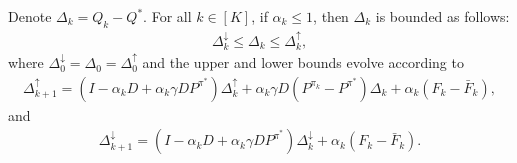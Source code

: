 \documentclass[10pt,a4paper]{amsart}
\begin{document}
\begin{lemma}
\label{lem_1}
Denote $\Delta_k = Q_k - Q^*$. For all $k \in [K]$, if $\alpha_k \leq 1$, then $\Delta_k$ is bounded as follows:
\begin{align*}
\Delta^{\downarrow}_k \leq \Delta_k \leq \Delta^{\uparrow}_k,
\end{align*}
where $\Delta^{\downarrow}_0 = \Delta_0 = \Delta^{\uparrow}_0$ and the upper and lower bounds evolve according to
\begin{align*}
\Delta^{\uparrow}_{k+1} = (I - \alpha_kD + \alpha_k \gamma D P^{\pi^*})\Delta^{\uparrow}_k + \alpha_k \gamma D(P^{\pi_k}-P^{\pi^*} )\Delta_k  + \alpha_k(F_k - \bar{F}_k),
\end{align*}
and
\begin{align*}
\Delta^{\downarrow}_{k+1} = (I - \alpha_kD + \alpha_k \gamma D P^{\pi^*})\Delta^{\downarrow}_k  + \alpha_k(F_k - \bar{F}_k).
\end{align*}
\end{lemma}
\end{document}
